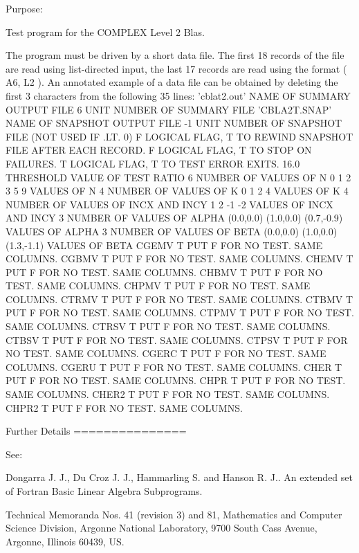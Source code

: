 \begin{DoxyParagraph}{Purpose\+: }
\begin{DoxyVerb} Test program for the COMPLEX          Level 2 Blas.

 The program must be driven by a short data file. The first 18 records
 of the file are read using list-directed input, the last 17 records
 are read using the format ( A6, L2 ). An annotated example of a data
 file can be obtained by deleting the first 3 characters from the
 following 35 lines:
 'cblat2.out'      NAME OF SUMMARY OUTPUT FILE
 6                 UNIT NUMBER OF SUMMARY FILE
 'CBLA2T.SNAP'     NAME OF SNAPSHOT OUTPUT FILE
 -1                UNIT NUMBER OF SNAPSHOT FILE (NOT USED IF .LT. 0)
 F        LOGICAL FLAG, T TO REWIND SNAPSHOT FILE AFTER EACH RECORD.
 F        LOGICAL FLAG, T TO STOP ON FAILURES.
 T        LOGICAL FLAG, T TO TEST ERROR EXITS.
 16.0     THRESHOLD VALUE OF TEST RATIO
 6                 NUMBER OF VALUES OF N
 0 1 2 3 5 9       VALUES OF N
 4                 NUMBER OF VALUES OF K
 0 1 2 4           VALUES OF K
 4                 NUMBER OF VALUES OF INCX AND INCY
 1 2 -1 -2         VALUES OF INCX AND INCY
 3                 NUMBER OF VALUES OF ALPHA
 (0.0,0.0) (1.0,0.0) (0.7,-0.9)       VALUES OF ALPHA
 3                 NUMBER OF VALUES OF BETA
 (0.0,0.0) (1.0,0.0) (1.3,-1.1)       VALUES OF BETA
 CGEMV  T PUT F FOR NO TEST. SAME COLUMNS.
 CGBMV  T PUT F FOR NO TEST. SAME COLUMNS.
 CHEMV  T PUT F FOR NO TEST. SAME COLUMNS.
 CHBMV  T PUT F FOR NO TEST. SAME COLUMNS.
 CHPMV  T PUT F FOR NO TEST. SAME COLUMNS.
 CTRMV  T PUT F FOR NO TEST. SAME COLUMNS.
 CTBMV  T PUT F FOR NO TEST. SAME COLUMNS.
 CTPMV  T PUT F FOR NO TEST. SAME COLUMNS.
 CTRSV  T PUT F FOR NO TEST. SAME COLUMNS.
 CTBSV  T PUT F FOR NO TEST. SAME COLUMNS.
 CTPSV  T PUT F FOR NO TEST. SAME COLUMNS.
 CGERC  T PUT F FOR NO TEST. SAME COLUMNS.
 CGERU  T PUT F FOR NO TEST. SAME COLUMNS.
 CHER   T PUT F FOR NO TEST. SAME COLUMNS.
 CHPR   T PUT F FOR NO TEST. SAME COLUMNS.
 CHER2  T PUT F FOR NO TEST. SAME COLUMNS.
 CHPR2  T PUT F FOR NO TEST. SAME COLUMNS.

 Further Details
 ===============

    See:

       Dongarra J. J., Du Croz J. J., Hammarling S.  and Hanson R. J..
       An  extended  set of Fortran  Basic Linear Algebra Subprograms.

       Technical  Memoranda  Nos. 41 (revision 3) and 81,  Mathematics
       and  Computer Science  Division,  Argonne  National Laboratory,
       9700 South Cass Avenue, Argonne, Illinois 60439, US.


\end{DoxyVerb}
\end{DoxyParagraph}

